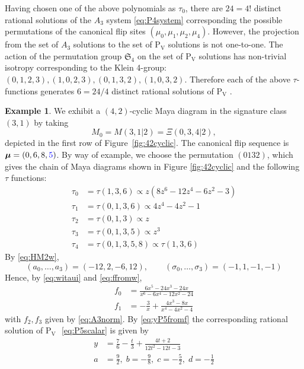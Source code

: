 \documentclass{amsart}
\theoremstyle{definition}
\newtheorem*{example}{Example} %
\newcommand{\bmu}{{\boldsymbol{\mu}}}
\newcommand{\fS}{\mathfrak{S}}
\newcommand{\PV}{$\mathrm{P}_{\mathrm{V}}\,\,$}
\begin{document}
Having chosen one of the above polynomials as $\tau_0$, there are
$24=4!$ distinct rational solutions of the $A_3$ system
\eqref{eq:P4system} corresponding the possible permutations of the
canonical flip sites $(\mu_0,\mu_1,\mu_2,\mu_4)$.  However, the
projection from the set of $A_3$ solutions to the set of \PV solutions
is not one-to-one.  The action of the permutation group $\fS_4$ on the
set of \PV solutions has non-trivial isotropy corresponding to the
Klein 4-group: $(0,1,2,3), (1,0,2,3), (0,1,3,2), (1,0,3,2)$.
Therefore each of the above $\tau$-functions generates $6=24/4$
distinct rational solutions of \PV.

\begin{example}\label{ex:42}
  We exhibit a $(4,2)$-cyclic Maya diagram in the signature class
  $(3,1)$ by taking
  \[M_0=M(3,1|2)=\Xi(0,3,4|2),\] depicted in the first row of
  Figure~\ref{fig:42cyclic}.  The canonical flip sequence is
  $\bmu=(0,6,8,{\color{blue}5})$.  By way of example, we choose the permutation
  $(0132)$, which gives the chain of Maya diagrams shown in Figure
  \ref{fig:42cyclic} and the following $\tau$ functions:
  \begin{align*}
    \tau_0 &= \tau(1,3,6) \propto z(8z^6-12z^4-6z^2-3)\\
    \tau_1 &= \tau(0,1,3,6)\propto 4z^4-4z^2-1 \\
    \tau_2 &= \tau(0,1,3)\propto z\\
    \tau_3 &= \tau(0,1,3,5)\propto z^3\\
    \tau_4 &= \tau(0,1,3,5,8)\propto \tau(1,3,6)
  \end{align*}
  By \eqref{eq:HM2w},
  \[ (a_0,\ldots, a_3) = (-12,2,-6,12),\qquad (\sigma_0,\ldots,
    \sigma_3) = (-1,1,-1,-1) \] Hence, by \eqref{eq:witaui} and
  \eqref{eq:ffromw},
  \[
    \begin{aligned}
      f_0 &= \frac{6x^5-24x^3-24x}{x^6-6x^4-12x^2-24}\\
      f_1 &= -\frac{3}{x}+ \frac{4x^3-8x}{x^4-4x^2-4}
    \end{aligned}\] with $f_2,f_3$ given by \eqref{eq:A3norm}. By
  \eqref{eq:yP5fromf} the corresponding rational solution of \PV
  \eqref{eq:P5scalar} is given by
  \[
    \begin{aligned}
      y &= \frac76-\frac{t}{3}+ \frac{4t+2}{12t^2-12t-3}\\
      a&= \frac92,\; b= -\frac98,\; c= -\frac52,\; d= -\frac12
    \end{aligned}
    \]

  \begin{figure}[ht]
    \centering
\end{figure}
\end{example}
\end{document}
